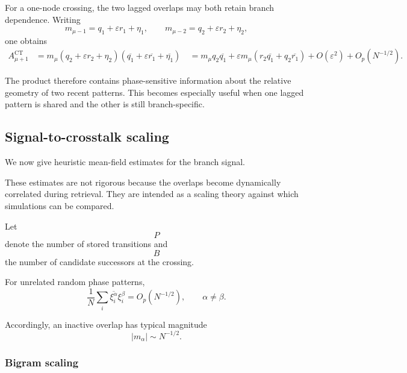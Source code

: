 For a one-node crossing, the two lagged overlaps may both retain branch
dependence.  Writing
\begin{equation}
m_{\mu-1}
=
q_1+\varepsilon r_1+\eta_1,
\qquad
m_{\mu-2}
=
q_2+\varepsilon r_2+\eta_2,
\end{equation}
one obtains
\begin{align}
A_{\mu+1}^{\mathrm{CT}}
&=
m_\mu
\left(q_2+\varepsilon r_2+\eta_2\right)
\left(
\overline{q_1}
+
\varepsilon\overline{r_1}
+
\overline{\eta_1}
\right)
\
&=
m_\mu q_2\overline{q_1}
+
\varepsilon m_\mu
\left(
r_2\overline{q_1}
+
q_2\overline{r_1}
\right)
+
O(\varepsilon^2)
+
O_p(N^{-1/2}).
\end{align}

The product therefore contains phase-sensitive information about the relative
geometry of two recent patterns.  This becomes especially useful when one
lagged pattern is shared and the other is still branch-specific.

\subsection{Signal-to-crosstalk scaling}

We now give heuristic mean-field estimates for the branch signal.

These estimates are not rigorous because the overlaps become dynamically
correlated during retrieval.  They are intended as a scaling theory against
which simulations can be compared.

Let
\begin{equation}
P
\end{equation}
denote the number of stored transitions and
\begin{equation}
B
\end{equation}
the number of candidate successors at the crossing.

For unrelated random phase patterns,
\begin{equation}
\frac{1}{N}
\sum_i
\overline{\xi_i^\alpha}\xi_i^\beta
=
O_p(N^{-1/2}),
\qquad
\alpha\neq\beta.
\end{equation}

Accordingly, an inactive overlap has typical magnitude
\begin{equation}
|m_\alpha|
\sim
N^{-1/2}.
\end{equation}

\subsubsection{Bigram scaling}

